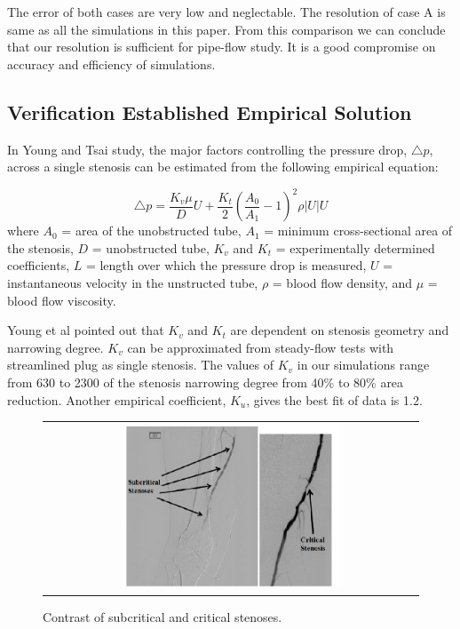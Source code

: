 The error of both cases are very low and neglectable. The resolution of case A is same as all the simulations in this paper. From this comparison we can conclude that our resolution is sufficient for pipe-flow study. It is a good compromise on accuracy and efficiency of simulations.

\subsection{Verification Established Empirical Solution}

In Young and Tsai\cite{Young&Tsai} study, the major factors controlling the pressure drop, $\triangle p$, across a single stenosis can be estimated from the following empirical equation:

\begin{equation}
\triangle p = \frac{K_v \mu}{D} U + \frac{K_t}{2}(\frac{A_0}{A_1} -1)^2 \rho \lvert U \rvert U %
\end{equation}
where $A_0$ = area of the unobstructed tube, $A_1$ = minimum cross-sectional area of the stenosis,
$D$ = unobstructed tube, $K_v$ and $K_t$ = experimentally determined coefficients, 
$L$ = length over which the pressure drop is measured, $U$ = instantaneous velocity in the unstructed tube,
$\rho$ = blood flow density, and $\mu$ = blood flow viscosity. 

Young et al\cite{Young&Cholvin} pointed out that $K_v$ and $K_t$ are dependent on stenosis geometry and narrowing degree.
$K_v$ can be approximated from steady-flow tests with streamlined plug as single stenosis.
The values of $K_v$ in our simulations range from 630 to 2300 of the stenosis narrowing degree from 40\% to 80\% area reduction.
Another empirical coefficient, $K_u$, gives the best fit of data is 1.2.

\begin{figure}[H]
	\centering
	\begin{tabular}{c}
		\includegraphics[width=0.6\textwidth]{./pics/photo.png}
	\end{tabular}
	\caption{\footnotesize Contrast of subcritical and critical stenoses.}
\end{figure}

